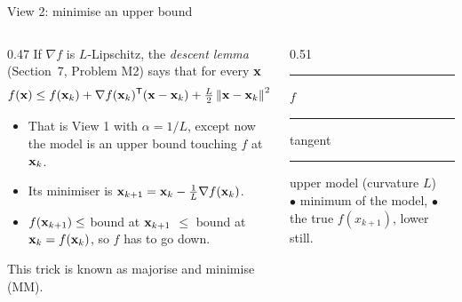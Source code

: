 \begin{frame}{View 2: minimise an upper bound}
  \begin{columns}[T]
    \begin{column}{0.47\textwidth}
      \small
      If $\nabla f$ is $L$-Lipschitz, the \emph{descent lemma} (Section~7, Problem M2) says that for every $\mathbf{x}$
      \[
        f(\mathbf{x}) \le f(\mathbf{x}_k) + \nabla f(\mathbf{x}_k)^{\mathsf T}(\mathbf{x}-\mathbf{x}_k) + \tfrac L2\left\lVert \mathbf{x}-\mathbf{x}_k \right\rVert^2 .
      \]
      \begin{itemize}\footnotesize
        \item That is View 1 with $\alpha = 1/L$, except now the model is an \alert{upper bound} touching $f$ at $\mathbf{x}_k$.
        \item Its minimiser is $\mathbf{x}_{k+1} = \mathbf{x}_k - \tfrac1L\nabla f(\mathbf{x}_k)$.
        \item $f(\mathbf{x}_{k+1}) \le$ bound at $\mathbf{x}_{k+1}$ $\le$ bound at $\mathbf{x}_k = f(\mathbf{x}_k)$, so $f$ \alert{has to go down}.
      \end{itemize}
      \footnotesize\textcolor{mGrey}{This trick is known as majorise and minimise (MM).}
    \end{column}
    \begin{column}{0.51\textwidth}
      \centering
      

      \scriptsize
      \textcolor{mInk}{\rule[2pt]{10pt}{1.8pt}} $f$ \quad
      \textcolor{mBlue}{\rule[2pt]{10pt}{1pt}} tangent \quad
      \textcolor{mOrange}{\rule[2pt]{10pt}{1.2pt}} upper model (curvature $L$)\\
      \textcolor{mOrange}{$\bullet$} minimum of the model, \quad \textcolor{mGreen}{$\bullet$} the true $f(x_{k+1})$, lower still.
    \end{column}
  \end{columns}
\end{frame}

